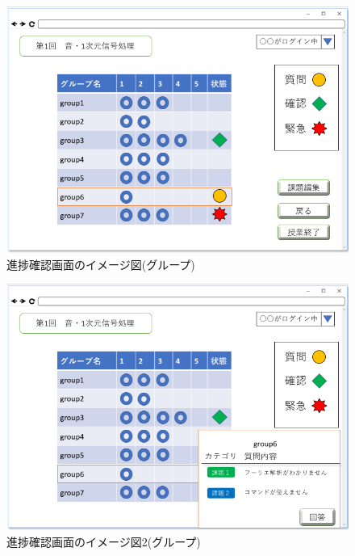 \begin{figure}[htbp]
\begin{center}
  \includegraphics[width=1\linewidth,clip]{./img/20.png}
  \caption{進捗確認画面のイメージ図(グループ)}\label{fig:20}
\end{center}
\end{figure}

\begin{figure}[htbp]
\begin{center}
  \includegraphics[width=1\linewidth,clip]{./img/21.png}
  \caption{進捗確認画面のイメージ図2(グループ)}\label{fig:21}
\end{center}
\end{figure}

